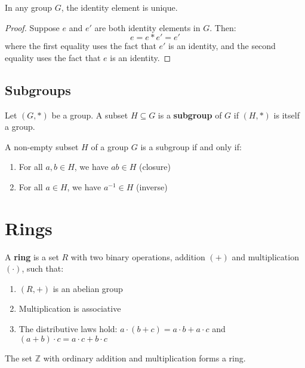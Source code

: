 \begin{theorem}
In any group $G$, the identity element is unique.
\end{theorem}

\begin{proof}
Suppose $e$ and $e'$ are both identity elements in $G$. Then:
\[e = e * e' = e'\]
where the first equality uses the fact that $e'$ is an identity, and the second equality uses the fact that $e$ is an identity.
\end{proof}

\subsection{Subgroups}

\begin{definition}[Subgroup]
Let $(G, *)$ be a group. A subset $H \subseteq G$ is a \textbf{subgroup} of $G$ if $(H, *)$ is itself a group.
\end{definition}

\begin{theorem}
A non-empty subset $H$ of a group $G$ is a subgroup if and only if:
\begin{enumerate}
    \item For all $a, b \in H$, we have $ab \in H$ (closure)
    \item For all $a \in H$, we have $a^{-1} \in H$ (inverse)
\end{enumerate}
\end{theorem}

\section{Rings}

\begin{definition}[Ring]
A \textbf{ring} is a set $R$ with two binary operations, addition $(+)$ and multiplication $(\cdot)$, such that:
\begin{enumerate}
    \item $(R, +)$ is an abelian group
    \item Multiplication is associative
    \item The distributive laws hold: $a \cdot (b + c) = a \cdot b + a \cdot c$ and $(a + b) \cdot c = a \cdot c + b \cdot c$
\end{enumerate}
\end{definition}

\begin{example}
The set $\mathbb{Z}$ with ordinary addition and multiplication forms a ring.
\end{example}

